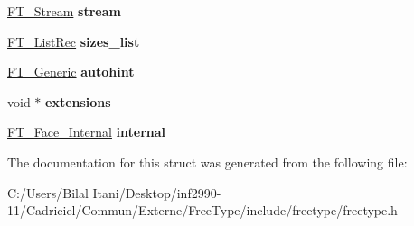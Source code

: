 \begin{DoxyCompactItemize}
\item 
\hyperlink{struct_f_t___stream_rec__}{F\+T\+\_\+\+Stream} {\bfseries stream}\hypertarget{struct_f_t___face_rec___a831d5da25cd0fe2a783d2a73f467de55}{}\label{struct_f_t___face_rec___a831d5da25cd0fe2a783d2a73f467de55}

\item 
\hyperlink{struct_f_t___list_rec__}{F\+T\+\_\+\+List\+Rec} {\bfseries sizes\+\_\+list}\hypertarget{struct_f_t___face_rec___a47504203e02bfba59c802c35cb4009ed}{}\label{struct_f_t___face_rec___a47504203e02bfba59c802c35cb4009ed}

\item 
\hyperlink{struct_f_t___generic__}{F\+T\+\_\+\+Generic} {\bfseries autohint}\hypertarget{struct_f_t___face_rec___a34ba9b1367f1b2d13676043b8da3ea73}{}\label{struct_f_t___face_rec___a34ba9b1367f1b2d13676043b8da3ea73}

\item 
void $\ast$ {\bfseries extensions}\hypertarget{struct_f_t___face_rec___a8b24f993e38da597d3e0273267890f49}{}\label{struct_f_t___face_rec___a8b24f993e38da597d3e0273267890f49}

\item 
\hyperlink{struct_f_t___face___internal_rec__}{F\+T\+\_\+\+Face\+\_\+\+Internal} {\bfseries internal}\hypertarget{struct_f_t___face_rec___aed9a1267cddcbe790f0591471c886537}{}\label{struct_f_t___face_rec___aed9a1267cddcbe790f0591471c886537}

\end{DoxyCompactItemize}


The documentation for this struct was generated from the following file\+:\begin{DoxyCompactItemize}
\item 
C\+:/\+Users/\+Bilal Itani/\+Desktop/inf2990-\/11/\+Cadriciel/\+Commun/\+Externe/\+Free\+Type/include/freetype/freetype.\+h\end{DoxyCompactItemize}
